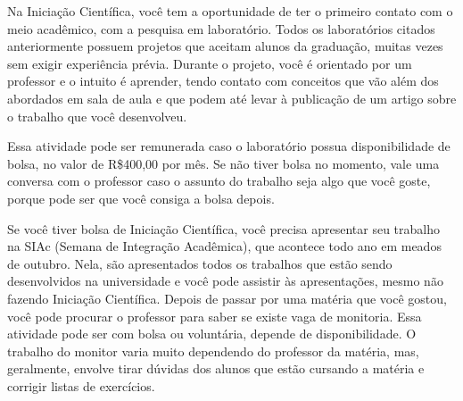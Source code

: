Na Iniciação Científica, você tem a oportunidade de ter o primeiro contato com o meio acadêmico, com a pesquisa em laboratório. Todos os laboratórios citados anteriormente possuem projetos que aceitam alunos da graduação, muitas vezes sem exigir experiência prévia. Durante o projeto, você é orientado por um professor e o intuito é aprender, tendo contato com conceitos que vão além dos abordados em sala de aula e que podem até levar à publicação de um artigo sobre o trabalho que você desenvolveu.

Essa atividade pode ser remunerada caso o laboratório possua disponibilidade de bolsa, no valor de R\$400,00 por mês. Se não tiver bolsa no momento, vale uma conversa com o professor caso o assunto do trabalho seja algo que você goste, porque pode ser que você consiga a bolsa depois.

Se você tiver bolsa de Iniciação Científica, você precisa apresentar seu trabalho na SIAc (Semana de Integração Acadêmica), que acontece todo ano em meados de outubro. Nela, são apresentados todos os trabalhos que estão sendo desenvolvidos na universidade e você pode assistir às apresentações, mesmo não fazendo Iniciação Científica. 
Depois de passar por uma matéria que você gostou, você pode procurar o professor para saber se existe vaga de monitoria. Essa atividade pode ser com bolsa ou voluntária, depende de disponibilidade. O trabalho do monitor varia muito dependendo do professor da matéria, mas, geralmente, envolve tirar dúvidas dos alunos que estão cursando a matéria e corrigir listas de exercícios. 